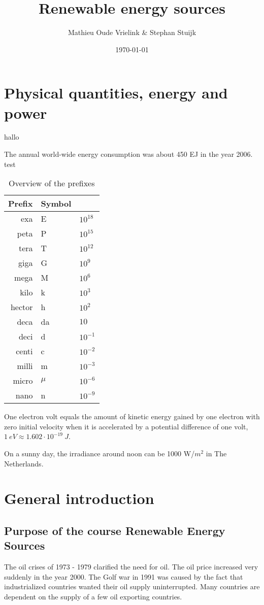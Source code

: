 \documentclass[a4paper,10pt]{article}
\title{Renewable energy sources}
\author{Mathieu Oude Vrielink \& Stephan Stuijk}
\date{\today}
\begin{document}
\maketitle

\section{Physical quantities, energy and power}
hallo

The annual world-wide energy consumption was about 450 EJ in the year 2006.
test

\begin{table}[ht]
\centering
 \begin{tabular}{r|ll}
  Prefix & Symbol & \\ \hline
  exa & E & $10^{18}$ \\
  peta & P & $10^{15}$ \\
  tera & T & $10^{12}$ \\
  giga & G & $10^{9}$ \\
  mega & M & $10^{6}$ \\
  kilo & k & $10^{3}$ \\
  hector & h & $10^{2}$ \\
  deca & da & $10$ \\
  deci& d & $10^{-1}$\\
  centi& c&$10^{-2}$\\
  milli& m&$10^{-3}$\\
  micro& $\mu$&$10^{-6}$\\
  nano& n&$10^{-9}$\\
 \end{tabular}
\caption{Overview of the prefixes}
\label{tab:prefixes}
\end{table}
One electron volt equals the amount of kinetic energy gained by one electron with zero initial velocity when it is accelerated by a potential difference of one volt, $1 \ eV \approx 1.602 \cdot 10^{-19}\ J$. \bigskip

On a sunny day, the irradiance around noon can be 1000 W/$m^2$ in The Netherlands.


\section{General introduction}

\subsection{Purpose of the course Renewable Energy Sources}
The oil crises of 1973 - 1979 clarified the need for oil. The oil price increased very suddenly in the year 2000. The Golf war in 1991 was caused by the fact that industrialized countries wanted their oil supply uninterrupted. Many countries are dependent on the supply of a few oil exporting countries. \bigskip
\end{document}
